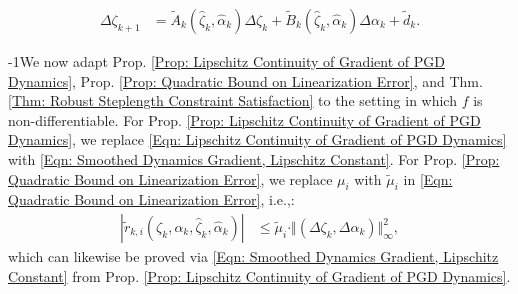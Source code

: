 \documentclass[letterpaper, 10 pt, conference]{ieeeconf}
\newcommand{\?}{\stackrel{?}{=}}
\newcommand{\ratePGDNominal}{\hat\ratePGD}
\newcommand{\ratePGDError}{\Delta\ratePGD}
\newcommand{\linearizationError}{r}
\newcommand{\disturbance}{d}
\newcommand{\linearizationErrorSmoothed}{\tilde{\linearizationError}}
\newcommand{\disturbanceSmoothed}{\tilde{\disturbance}}
\newcommand{\ratePGD}{\alpha}
\newcommand{\jacobianState}{A}
\newcommand{\jacobianControl}{B}
\newcommand{\jacobianStateSmoothed}{\tilde{\jacobianState}}
\newcommand{\jacobianControlSmoothed}{\tilde{\jacobianControl}}
\newcommand{\state}{\zeta}
\newcommand{\stateNominal}{\hat\state}
\newcommand{\stateError}{\Delta\state}
\newcommand{\dynamicsFullState}{f}
\newcommand{\hessianBound}{\mu}
\newcommand{\hessianBoundSmoothed}{\tilde{\hessianBound}}
\newcommand{\frank}[1]{{\textcolor[rgb]{0,0,1}{\textsf{[Frank: {#1}]}}}}
\newcommand{\antoine}[1]{{\textcolor[rgb]{1,0,0}{\textsf{[Antoine: {#1}]}}}}
\begin{document}
{
\setlength{\abovedisplayskip}{3.5pt}
\setlength{\belowdisplayskip}{3.5pt}
\begin{align} \nonumber
    \stateError_{k+1} 
    &= \jacobianStateSmoothed_k(\stateNominal_k, \ratePGDNominal_k) \stateError_k + \jacobianControlSmoothed_k(\stateNominal_k, \ratePGDNominal_k) \ratePGDError_k + \disturbanceSmoothed_k.
\end{align}
}

\looseness-1We now adapt Prop. \ref{Prop: Lipschitz Continuity of Gradient of PGD Dynamics}, Prop. \ref{Prop: Quadratic Bound on Linearization Error}, and Thm. \ref{Thm: Robust Steplength Constraint Satisfaction} to the setting in which $\dynamicsFullState$ is non-differentiable.
For Prop. \ref{Prop: Lipschitz Continuity of Gradient of PGD Dynamics}, we replace \eqref{Eqn: Lipschitz Continuity of Gradient of PGD Dynamics} with \eqref{Eqn: Smoothed Dynamics Gradient, Lipschitz Constant}.
For Prop. \ref{Prop: Quadratic Bound on Linearization Error}, we replace $\hessianBound_i$ with $\hessianBoundSmoothed_i$ in \eqref{Eqn: Quadratic Bound on Linearization Error}, i.e.,:
{
\setlength{\abovedisplayskip}{3.5pt}
\setlength{\belowdisplayskip}{3.5pt}
\begin{align}
\label{Eqn: Quadratic Bound on Linearization Error, with Smoothed Dynamics}
    |\linearizationErrorSmoothed_{k,i}(\state_k, \ratePGD_k, \stateNominal_k, \ratePGDNominal_k)| &\leq \hessianBoundSmoothed_i \cdot \Vert (\stateError_k, \ratePGDError_k) \Vert_\infty^2,
\end{align}
}
which can likewise be proved via \eqref{Eqn: Smoothed Dynamics Gradient, Lipschitz Constant} from Prop. \ref{Prop: Lipschitz Continuity of Gradient of PGD Dynamics}.
\end{document}
